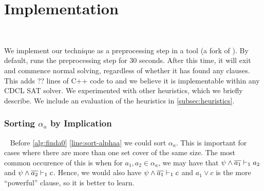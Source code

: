 \section{Implementation}~\label{sec:implementation}

We implement our technique as a preprocessing step in a tool \tool (a fork of \cadical
). By default, \tool runs the preprocessing step for
30 seconds. After this time, it will exit and commence normal solving,
regardless of whether it has found any \pr clauses. This adds ??
lines of C++ code to \cadical and we believe it is implementable within any CDCL
SAT solver. We experimented with other heuristics, which we briefly describe. We
include an evaluation of the heuristics in \autoref{subsec:heuristics}.





\subsubsection{Sorting $\alpha_a$ by Implication}~\label{subsubsec:impordering}
Before \autoref{alg:finda0} \autoref{line:sort-alphaa} we could sort $\alpha_a$.
This is important for cases where there are more than one set cover of the same
size. The most common occurence of this is when for $a_1, a_2 \in \alpha_a$, we
may have that $\psi \land \overline{a_1} \vdash_1 a_2$ and
$\psi \land \overline{a_2} \vdash_1 c$. Hence, we would also have $\psi \land \overline{a_1} \vdash_1 c$
and $a_1 \lor c$ is the more ``powerful'' clause, so it is better to learn.

